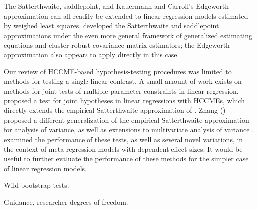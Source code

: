 \documentclass[12pt]{article}\usepackage[]{graphicx}\usepackage[]{color}
\begin{document}
The Satterthwaite, saddlepoint, and Kauermann and Carroll's Edgeworth approximation can all readily be extended to linear regression models estimated by weighed least squares. \citet{McCaffrey2006improved} developed the Satterthwaite and saddlepoint approximations under the even more general framework of generalized estimating equations and cluster-robust covariance matrix estimators; the Edgeworth approximation also appears to apply directly in this case.

Our review of HCCME-based hypothesis-testing procedures was limited to methods for testing a single linear contrast. A small amount of work exists on methods for joint tests of multiple parameter constraints in linear regression. \citet{Cai2008new} proposed a test for joint hypotheses in linear regressions with HCCMEs, which directly extends the empirical Satterthwaite approximation of \citet{Lipsitz1999degrees}. Zhang (\citeyear{Zhang2012twowayANOVA, Zhang2013tests}) proposed a different generalization of the empirical Satterthwaite approximation for analysis of variance, as well as extensions to multivariate analysis of variance \citep{Zhang2012MANOVA}. \citet{Tipton2015small-F} examined the performance of these tests, as well as several novel variations, in the context of meta-regression models with dependent effect sizes. It would be useful to further evaluate the performance of these methods for the simpler case of linear regression models.

Wild bootstrap tests.

Guidance, researcher degrees of freedom.



\end{document}
